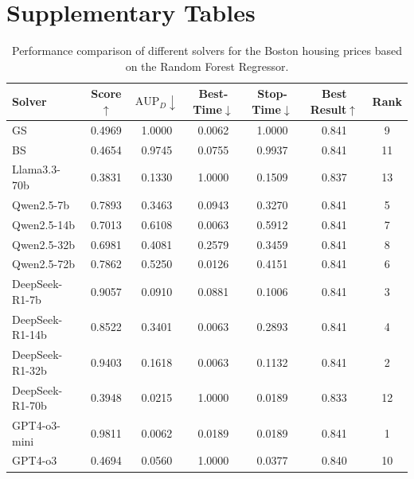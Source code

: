 \section{Supplementary Tables}
\label{sec:supp_tables}
\begin{table}[h]
    \centering
    \setlength{\tabcolsep}{3pt}
    \renewcommand\arraystretch{1.5}
    \caption{Performance comparison of different solvers for the Boston housing prices based on the Random Forest Regressor.}
    \begin{tabular}{l|cccccc}
    \toprule
    Solver           & Score$\uparrow$ & $\text{AUP}_D\downarrow$ & Best-Time$\downarrow$ & Stop-Time$\downarrow$ & Best Result$\uparrow$ & Rank \\
    \midrule
    GS & 0.4969 & 1.0000 & 0.0062 & 1.0000 & 0.841 & 9 \\
    BS & 0.4654 & 0.9745 & 0.0755 & 0.9937 & 0.841 & 11 \\
    Llama3.3-70b & 0.3831 & 0.1330 & 1.0000 & 0.1509 & 0.837 & 13 \\
    Qwen2.5-7b & 0.7893 & 0.3463 & 0.0943 & 0.3270 & 0.841 & 5 \\
    Qwen2.5-14b & 0.7013 & 0.6108 & 0.0063 & 0.5912 & 0.841 & 7 \\
    Qwen2.5-32b & 0.6981 & 0.4081 & 0.2579 & 0.3459 & 0.841 & 8 \\
    Qwen2.5-72b & 0.7862 & 0.5250 & 0.0126 & 0.4151 & 0.841 & 6 \\
    DeepSeek-R1-7b & 0.9057 & 0.0910 & 0.0881 & 0.1006 & 0.841 & 3 \\
    DeepSeek-R1-14b & 0.8522 & 0.3401 & 0.0063 & 0.2893 & 0.841 & 4 \\
    DeepSeek-R1-32b & 0.9403 & 0.1618 & 0.0063 & 0.1132 & 0.841 & 2 \\
    DeepSeek-R1-70b & 0.3948 & 0.0215 & 1.0000 & 0.0189 & 0.833 & 12 \\
    GPT4-o3-mini & 0.9811 & 0.0062 & 0.0189 & 0.0189 & 0.841 & 1 \\
    GPT4-o3 & 0.4694 & 0.0560 & 1.0000 & 0.0377 & 0.840 & 10 \\
    \bottomrule
    \end{tabular}
    \label{tab:Boston}
\end{table}


